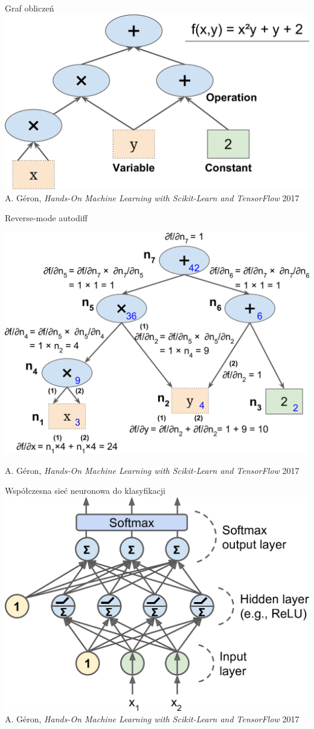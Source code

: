 \documentclass{sa}
\begin{document}
\begin{frame}{Graf obliczeń}
\includegraphics[width=\textwidth]{comp_graph.png}
{\vfill\footnotesize A. Géron, \emph{Hands-On Machine Learning with Scikit-Learn and TensorFlow} 2017}
\end{frame}

\begin{frame}{Reverse-mode autodiff}
\begin{center}
\includegraphics[width=.8\textwidth]{rev-mode_autodiff.png}
\end{center}
{\vfill\footnotesize A. Géron, \emph{Hands-On Machine Learning with Scikit-Learn and TensorFlow} 2017}
\end{frame}

\begin{frame}{Współczesna sieć neuronowa do klasyfikacji}
\centering\includegraphics[width=.9\textwidth]{mlp_relu_softmax.png}
{\vfill\footnotesize A. Géron, \emph{Hands-On Machine Learning with Scikit-Learn and TensorFlow} 2017}
\end{frame}
\end{document}
